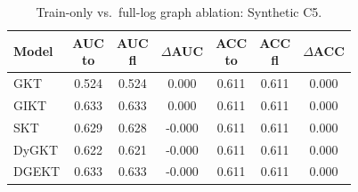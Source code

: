 \begin{table}[t]
\centering
\scriptsize
\setlength{\tabcolsep}{2pt}
\caption{Train-only vs.\ full-log graph ablation: Synthetic C5.}
\label{tab:graph-ablation-synthetic-c5}
\begin{tabular}{@{} >{\RaggedRight\arraybackslash}p{12mm} *{6}{c} @{}}
\toprule
Model & \makecell{AUC\\to} & \makecell{AUC\\fl} & $\Delta$AUC & \makecell{ACC\\to} & \makecell{ACC\\fl} & $\Delta$ACC \\
\midrule
GKT & 0.524 & 0.524 & 0.000 & 0.611 & 0.611 & 0.000 \\
GIKT & 0.633 & 0.633 & 0.000 & 0.611 & 0.611 & 0.000 \\
SKT & 0.629 & 0.628 & -0.000 & 0.611 & 0.611 & 0.000 \\
DyGKT & 0.622 & 0.621 & -0.000 & 0.611 & 0.611 & 0.000 \\
DGEKT & 0.633 & 0.633 & -0.000 & 0.611 & 0.611 & 0.000 \\
\bottomrule
\end{tabular}
\end{table}
